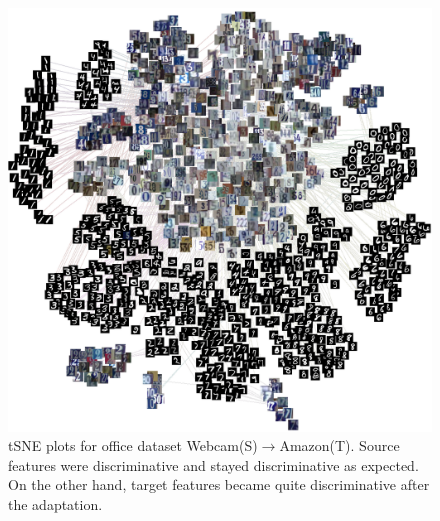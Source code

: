 \begin{figure}[ht]
    ~
    ~
    ~
    \caption{tSNE plots for office dataset Webcam(S)$\rightarrow$Amazon(T). Source features were discriminative and stayed discriminative as expected. On the other hand, target features became quite discriminative after the adaptation.}
    \label{fig:tsne}
        \includegraphics[width=\textwidth]{out_im.png}

\end{figure}
